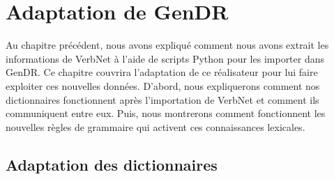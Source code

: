 
\chapter{Adaptation de GenDR}\label{ch:implementation}

Au chapitre précédent, nous avons expliqué comment nous avons extrait les informations de VerbNet à l'aide de scripts Python pour les importer dans GenDR. Ce chapitre couvrira l'adaptation de ce réalisateur pour lui faire exploiter ces nouvelles données. D'abord, nous expliquerons comment nos dictionnaires fonctionnent après l'importation de VerbNet et comment ils communiquent entre eux. Puis, nous montrerons comment fonctionnent les nouvelles règles de grammaire qui activent ces connaissances lexicales.

\section{Adaptation des dictionnaires}


